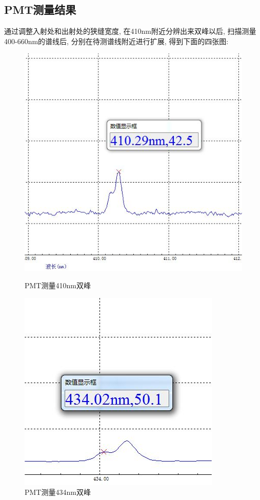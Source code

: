 \documentclass[12pt,a4paper]{article}
\begin{document}
\subsection{PMT测量结果}
通过调整入射处和出射处的狭缝宽度, 在410nm附近分辨出来双峰以后, 扫描测量400-660nm的谱线后, 分别在待测谱线附近进行扩展, 得到下面的四张图:
\begin{figure}[htbp]
	\centering
	\begin{minipage}{0.49\linewidth}
		\centering
		\includegraphics[width=0.9\linewidth]{HD410.png}
		\caption{PMT测量410nm双峰}
		
	\end{minipage}
	\begin{minipage}{0.49\linewidth}
		\centering
		\includegraphics[width=0.9\linewidth]{HD434.png}
		\caption{PMT测量434nm双峰}
		

\end{minipage}
\end{figure}
\end{document}
